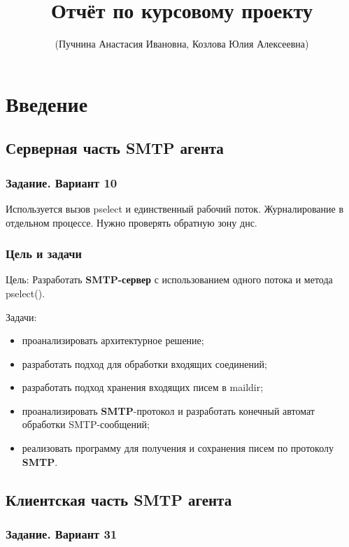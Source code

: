 \documentclass[a4paper,12pt]{report}
\title{Отчёт по курсовому проекту }
\author{(Пучнина Анастасия Ивановна, Козлова Юлия Алексеевна)}
\begin{document}
\maketitle

\tableofcontents

\chapter*{Введение}

\section{Серверная часть SMTP агента}

\subsection{Задание. Вариант 10}

Используется вызов pselect и единственный рабочий поток. Журналирование в отдельном процессе. Нужно проверять обратную зону днс.

\subsection{Цель и задачи}

Цель:
    Разработать \textbf{SMTP-сервер} с использованием одного потока и метода pselect().

Задачи:
\begin{itemize}
    \item проанализировать архитектурное решение;
    \item разработать подход для обработки входящих соединений;
    \item разработать подход хранения входящих писем в maildir;
    \item проанализировать \textbf{SMTP}-протокол и разработать конечный автомат обработки SMTP-сообщений;
    \item реализовать программу для получения и сохранения писем по протоколу \textbf{SMTP}.
\end{itemize}

\section{Клиентская часть SMTP агента}

\subsection{Задание. Вариант 31}
\end{document}
